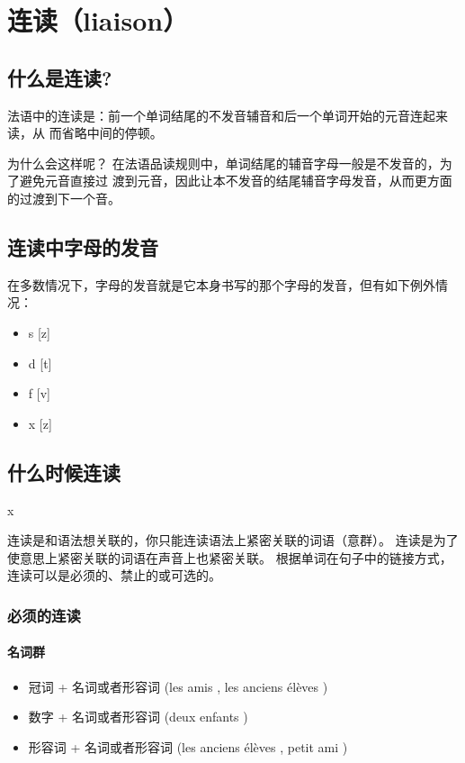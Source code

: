 
\chapter{连读（liaison）}
\label{cha:liaison}


\section{什么是连读?}

法语中的连读是：前一个单词结尾的不发音辅音和后一个单词开始的元音连起来读，从
而省略中间的停顿。

为什么会这样呢？
在法语品读规则中，单词结尾的辅音字母一般是不发音的，为了避免元音直接过
渡到元音，因此让本不发音的结尾辅音字母发音，从而更方面的过渡到下一个音。



\section{连读中字母的发音}

在多数情况下，字母的发音就是它本身书写的那个字母的发音，但有如下例外情
况：

\begin{itemize}
\item s [z]
\item d [t]
\item f [v]
\item x [z]
\end{itemize}


\section{什么时候连读}x

连读是和语法想关联的，你只能连读语法上紧密关联的词语（意群）。
连读是为了使意思上紧密关联的词语在声音上也紧密关联。
根据单词在句子中的链接方式，连读可以是必须的、禁止的或可选的。



\subsection{必须的连读}

\subsubsection{名词群}

\begin{itemize}
\item 冠词 + 名词或者形容词 (les amis \textipa{[lE za mi]}, les anciens élèves \textipa{[lE z\~a si j\~E ze lEv]})
\item 数字 + 名词或者形容词 (deux enfants \textipa{[d\o \ z\~a f\~a]})
\item 形容词 + 名词或者形容词 (les anciens élèves \textipa{[lE z\~a si j\~E ze lEv]}, petit ami \textipa{[p@ ti ta mi]})
\end{itemize}


